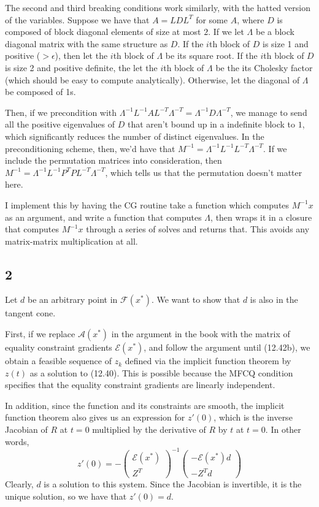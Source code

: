 \documentclass{article}
\newcommand{\ep}{\epsilon}
\newcommand{\openm}{\begin{pmatrix}}
\newcommand{\closem}{\end{pmatrix}}
\begin{document}
The second and third breaking conditions work similarly, with the hatted version of the variables.
Suppose we have that $A=LDL^T$ for some $A$, where $D$ is composed of block diagonal elements of size at most $2$. If we let $\Lambda$ be a block diagonal matrix with the same structure as $D$. If the $i$th block of $D$ is size 1 and positive ($>\ep$), then let the $i$th block of $\Lambda$ be its square root. If the $i$th block of $D$ is size 2 and positive definite, the let the $i$th block of $\Lambda$ be the its Cholesky factor (which should be easy to compute analytically). Otherwise, let the diagonal of $\Lambda$ be composed of 1s. 

Then, if we precondition with $\Lambda^{-1} L^{-1}AL^{-T}\Lambda^{-T}=\Lambda^{-1} D\Lambda^{-T}$, we manage to send all the positive eigenvalues of $D$ that aren't bound up in a indefinite block to $1$, which significantly reduces the number of distinct eigenvalues. In the preconditioning scheme, then, we'd have that $M^{-1}=\Lambda^{-1} L^{-1}L^{-T}\Lambda^{-T}$. If we include the permutation matrices into consideration, then $M^{-1}=\Lambda^{-1} L^{-1}P^TPL^{-T}\Lambda^{-T}$, which tells us that the permutation doesn't matter here.

I implement this by having the CG routine take a function which computes $M^{-1}x$ as an argument, and write a function that computes $\Lambda$, then wraps it in a closure that computes $M^{-1}x$ through a series of solves and returns that. This avoids any matrix-matrix multiplication at all.
\subsection*{2}
Let $d$ be an arbitrary point in $\mathscr{F}(x^*)$. We want to show that $d$ is also in the tangent cone.

First, if we replace $\mathscr{A}(x^*)$ in the argument in the book with the matrix of equality constraint gradients $\mathscr{E}(x^*)$, and follow the argument until (12.42b), we obtain a feasible sequence of $z_k$ defined via the implicit function theorem by $z(t)$ as a solution to (12.40). This is possible because the MFCQ condition specifies that the equality constraint gradients are linearly independent. 

In addition, since the function and its constraints are smooth, the implicit function theorem also gives us an expression for $z'(0)$, which is the inverse Jacobian of $R$ at $t=0$ multiplied by the derivative of $R$ by $t$ at $t=0$. In other words, 
\[z'(0)=-\openm \mathscr{E}(x^*)\\Z^T\closem^{-1}\openm-\mathscr{E}(x^*)d\\-Z^Td\closem\]
Clearly, $d$ is a solution to this system. Since the Jacobian is invertible, it is the unique solution, so we have that $z'(0)=d$.
\end{document}
